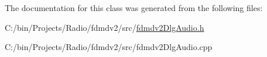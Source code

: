 The documentation for this class was generated from the following files\-:\begin{DoxyCompactItemize}
\item 
C\-:/bin/\-Projects/\-Radio/fdmdv2/src/\hyperlink{fdmdv2_dlg_audio_8h}{fdmdv2\-Dlg\-Audio.\-h}\item 
C\-:/bin/\-Projects/\-Radio/fdmdv2/src/fdmdv2\-Dlg\-Audio.\-cpp\end{DoxyCompactItemize}
